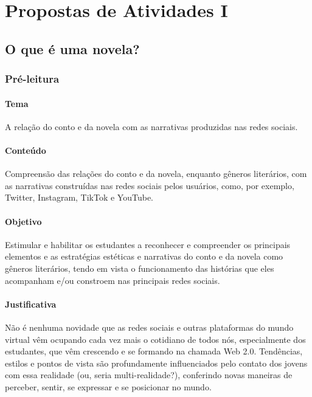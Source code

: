 \documentclass[12pt]{extarticle}
\begin{document}
\tableofcontents


\section{Propostas de Atividades I}

\subsection{O que é uma novela?}

\subsubsection{Pré-leitura}



\paragraph{Tema} A relação do conto e da novela com as narrativas produzidas nas redes sociais. 

\paragraph{Conteúdo} Compreensão das relações do conto e da novela,
enquanto gêneros literários, com as narrativas construídas nas redes
sociais pelos usuários, como, por exemplo, Twitter, Instagram, TikTok e
YouTube.

\paragraph{Objetivo} Estimular e habilitar os estudantes a reconhecer e
compreender os principais elementos e as estratégias estéticas e
narrativas do conto e da novela como gêneros literários, tendo em vista
o funcionamento das histórias que eles acompanham e/ou constroem nas
principais redes sociais.

\paragraph{Justificativa} Não é nenhuma novidade que as redes sociais e
outras plataformas do mundo virtual vêm ocupando cada vez mais o
cotidiano de todos nós, especialmente dos estudantes, que vêm crescendo
e se formando na chamada Web 2.0. Tendências, estilos e pontos de vista
são profundamente influenciados pelo contato dos jovens com essa
realidade (ou, seria multi-realidade?), conferindo novas maneiras de
perceber, sentir, se expressar e se posicionar no mundo.
\end{document}
